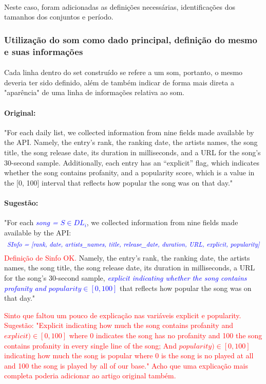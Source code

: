 \documentclass{article}
\begin{document}
\paragraph{}
Neste caso, foram adicionadas as definições necessárias, identificações dos tamanhos dos conjuntos e período.

\subsubsection{Utilização do som como dado principal, definição do mesmo e suas informações}
\paragraph{}
Cada linha dentro do set construído se refere a um som, portanto, o mesmo deveria ter sido definido, além de também indicar de forma mais direta a "aparência" de uma linha de informações relativa ao som.

\paragraph{Original: }
"For each daily list, we collected information from nine fields
made available by the API. Namely, the entry’s rank, the
ranking date, the artists names, the song title, the song release
date, its duration in milliseconds, and a URL for the song’s
30-second sample. Additionally, each entry has an “explicit”
flag, which indicates whether the song contains profanity, and
a popularity score, which is a value in the [0, 100] interval that
reflects how popular the song was on that day."

\paragraph{Sugestão: }
"For each \textcolor{blue} {\textit{song = \(S \in DL_{i}\)}}, we collected information from nine fields made available by the API: 
\[
\textcolor{blue} {\textit{
SInfo = [rank, date, artists\_names, title, release\_date, duration, URL, explicit, popularity]
}}
\]
\textcolor{red}{Definição de Sinfo OK.}
Namely, the entry’s rank, the
ranking date, the artists names, the song title, the song release
date, its duration in milliseconds, a URL for the song’s
30-second sample,\textcolor{blue} {\textit{ explicit indicating whether the song contains profanity and  \(popularity \in [0, 100]\)}} that
reflects how popular the song was on that day."

\textcolor{red}{Sinto que faltou um pouco de explicação nas variáveis explicit e popularity. Sugestão: "Explicit indicating how much the song contains profanity and \(explicit) \in [0,100]\) where 0 indicates the song has no profanity and 100 the song contains profanity in every single line of the song; And  \(popularity) \in [0,100]\) indicating how much the song is popular where 0 is the song is no played at all and 100 the song is played by all of our base." Acho que uma explicação mais completa poderia adicionar ao artigo original também.}
\end{document}
